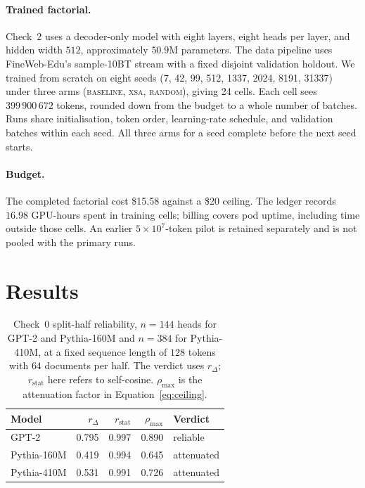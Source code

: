 \documentclass{article} %
\begin{document}
\paragraph{Trained factorial.} Check~2 uses a decoder-only model with eight
layers, eight heads per layer, and hidden width $512$, approximately $50.9$M
parameters. The data pipeline uses FineWeb-Edu's sample-10BT stream with a
fixed disjoint validation holdout. We trained from scratch on eight seeds
(7, 42, 99, 512, 1337, 2024, 8191, 31337) under three
arms (\textsc{baseline}, \textsc{xsa}, \textsc{random}), giving 24 cells.
Each cell sees $399\,900\,672$ tokens, rounded down from the budget to a
whole number of batches. Runs share initialisation, token order, learning-rate
schedule, and validation batches within each seed. All three arms for a seed
complete before the next seed starts.

\paragraph{Budget.} The completed factorial cost \$15.58 against a \$20
ceiling. The ledger records $16.98$ GPU-hours spent in training cells;
billing covers pod uptime, including time outside those cells. An earlier
$5\times10^{7}$-token pilot is retained separately and is not pooled with
the primary runs.

\section{Results}

\begin{table}[tb]
\centering
\small
\begin{tabular}{@{}lrrrl@{}}
\toprule
Model & $r_\Delta$ & $r_{\text{stat}}$ & $\rho_{\max}$ & Verdict \\
\midrule
GPT-2         & 0.795 & 0.997 & 0.890 & reliable \\
Pythia-160M   & 0.419 & 0.994 & 0.645 & attenuated \\
Pythia-410M   & 0.531 & 0.991 & 0.726 & attenuated \\
\bottomrule
\end{tabular}
\caption{Check~0 split-half reliability, $n = 144$ heads for GPT-2 and
Pythia-160M and $n = 384$ for Pythia-410M, at a fixed sequence length of $128$
tokens with $64$ documents per half. The verdict uses $r_\Delta$;
$r_{\text{stat}}$ here refers to self-cosine. $\rho_{\max}$ is the
attenuation factor in Equation~\ref{eq:ceiling}.}
\label{tab:reliability}
\end{table}
\end{document}
